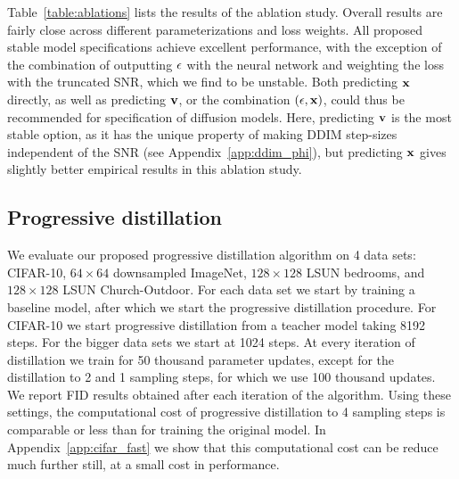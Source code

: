 \documentclass[hidelinks]{article} %
\begin{document}
Table~\ref{table:ablations} lists the results of the ablation study. Overall results are fairly close across different parameterizations and loss weights. All proposed stable model specifications achieve excellent performance, with the exception of the combination of outputting ${\mathbf{\epsilon}}$ with the neural network and weighting the loss with the truncated SNR, which we find to be unstable. Both predicting ${\mathbf{x}}$ directly, as well as predicting ${\mathbf{v}}$, or the combination $({\mathbf{\epsilon}},{\mathbf{x}})$, could thus be recommended for specification of diffusion models. Here, predicting ${\mathbf{v}}$ is the most stable option, as it has the unique property of making DDIM step-sizes independent of the SNR (see Appendix~\ref{app:ddim_phi}), but predicting ${\mathbf{x}}$ gives slightly better empirical results in this ablation study.



\subsection{Progressive distillation}
\label{sec:dist_experiments}
We evaluate our proposed progressive distillation algorithm on 4 data sets: CIFAR-10, $64\times64$ downsampled ImageNet, $128\times128$ LSUN bedrooms, and $128\times128$ LSUN Church-Outdoor. For each data set we start by training a baseline model, after which we start the progressive distillation procedure. For CIFAR-10 we start progressive distillation from a teacher model taking 8192 steps. For the bigger data sets we start at 1024 steps. At every iteration of distillation we train for 50 thousand parameter updates, except for the distillation to 2 and 1 sampling steps, for which we use 100 thousand updates. We report FID results obtained after each iteration of the algorithm. Using these settings, the computational cost of progressive distillation to 4 sampling steps is comparable or less than for training the original model. In Appendix~\ref{app:cifar_fast} we show that this computational cost can be reduce much further still, at a small cost in performance.
\end{document}
